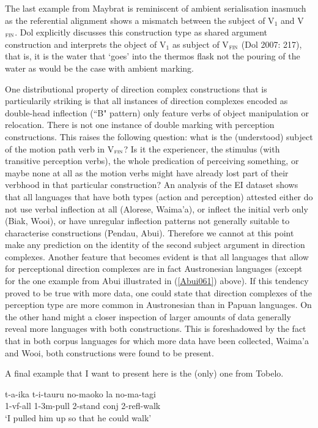 The last example from Maybrat is reminiscent of ambient serialisation inasmuch as the referential alignment shows a mismatch between the subject of V$_{1}$ and V$_{\textsc{fin}}$. Dol explicitly discusses this construction type as shared argument construction and interprets the object of V$_{1}$ as subject of V$_{\textsc{fin}}$ (Dol 2007: 217), that is, it is the water that `goes' into the thermos flask not the pouring of the water as would be the case with ambient marking. 

One distributional property of direction complex constructions that is particularily striking is that all instances of direction complexes encoded as double-head inflection (``B" pattern) only feature verbs of object manipulation or relocation. There is not one instance of double marking with perception constructions. This raises the following question: what is the (understood) subject of the motion path verb in V$_{\textsc{fin}}$? Is it the experiencer, the stimulus (with transitive perception verbs), the whole predication of perceiving something, or maybe none at all as the motion verbs might have already lost part of their verbhood in that particular construction? An analysis of the EI dataset shows that all languages that have both types (action and perception) attested either do not use verbal inflection at all (Alorese, Waima'a), or inflect the initial verb only (Biak, Wooi), or have unregular inflection patterns not generally suitable to characterise constructions (Pendau, Abui). Therefore we cannot at this point make any prediction on the identity of the second subject argument in direction complexes. Another feature that becomes evident is that all languages that allow for perceptional direction complexes are in fact Austronesian languages (except for the one example from Abui illustrated in (\ref{Abui061}) above). If this tendency proved to be true with more data, one could state that direction complexes of the perception type are more common in Austronesian than in Papuan languages. On the other hand might a closer inspection of larger amounts of data generally reveal more languages with both constructions. This is foreshadowed by the fact that in both corpus languages for which more data have been collected, Waima'a and Wooi, both constructions were found to be present.

A final example that I want to present here is the (only) one from Tobelo. 

\ea \label{Tobelo033}
\gll t-a-ika t-i-tauru no-maoko la no-ma-tagi \\
\acs{1}-\acs{vf}-\acs{all} \acs{1}-\acs{3}\acs{m}-pull \acs{2}-stand \acs{conj} \acs{2}-\acs{refl}-walk \\
\glft `I pulled him up so that he could walk' \\ 
\z
\xe

